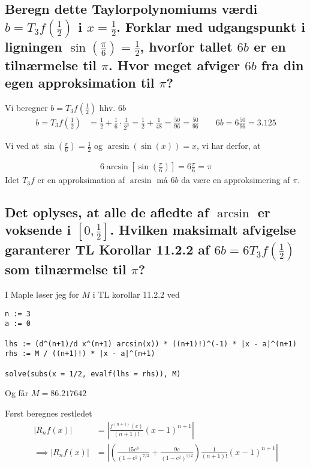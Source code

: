 \documentclass[11pt,a4paper]{article}
\newcommand{\modulus}[1]{\left|#1\right|}
\newcommand{\half}{\frac{1}{2}}
\begin{document}
\subsection
{
    \mdseries
    Beregn dette Taylorpolynomiums værdi $b = T_3 f (\half)$ i $x = \half$.
    Forklar med udgangspunkt i ligningen $\sin(\frac{\pi}{6}) = \half$,
    hvorfor tallet $6b$ er en tilnærmelse til $\pi$. Hvor meget afviger $6b$
    fra din egen approksimation til $\pi$?
}
Vi beregner $b = T_3 f(\frac{1}{2})$ hhv. $6b$
\begin{align}
    b = T_3 f \left( \frac{1}{2} \right)
    &= \frac{1}{2} + \frac{1}{6} \cdot \frac{1}{2^3}
     = \frac{1}{2} + \frac{1}{48}
     = \frac{50}{96}
     = \frac{50}{96}
     \qquad
     6b = 6 \frac{50}{96} = 3.125
\end{align}

Vi ved at $\sin(\frac{\pi}{6}) = \half$ og $\arcsin(\sin(x)) = x$, vi har
derfor, at

\begin{align}
    6 \arcsin \left[ \sin \left( \frac{\pi}{6} \right) \right]
    = 6 \frac{\pi}{6}
    = \pi
\end{align}
Idet $T_3 f$ er en approksimation af $\arcsin$ må $6b$ da være en
approksimering af $\pi$.

\subsection
{
    \mdseries
    Det oplyses, at alle de afledte af $\arcsin$ er voksende i $[0,\half]$.
    Hvilken maksimalt afvigelse garanterer TL Korollar 11.2.2 af $6b = 6T_3
    f(\half)$ som tilnærmelse til $\pi$?
}
I Maple løser jeg for $M$ i TL korollar 11.2.2 ved
\begin{lstlisting}
n := 3
a := 0

lhs := (d^(n+1)/d x^(n+1) arcsin(x)) * ((n+1)!)^(-1) * |x - a|^(n+1)
rhs := M / ((n+1)!) * |x - a|^(n+1)

solve(subs(x = 1/2, evalf(lhs = rhs)), M)
\end{lstlisting}
Og får $M = 86.217642$

\iffalse
Først beregnes restledet
\begin{align}
    \modulus{R_n f(x)} &= \modulus{\frac{f^{(n+1)}(c)}{(n + 1)!} (x - 1)^{n+1}} \\
    \implies
    \modulus{R_n f(x)} &= \modulus{
        \left( \frac{15c^3}{(1 - c^2)^{7/2}} +
               \frac{9c}{(1 - c^2)^{5/2}}
        \right)
        \frac{1}{(n + 1)!} (x - 1)^{n+1}}
\end{align}
\end{document}
